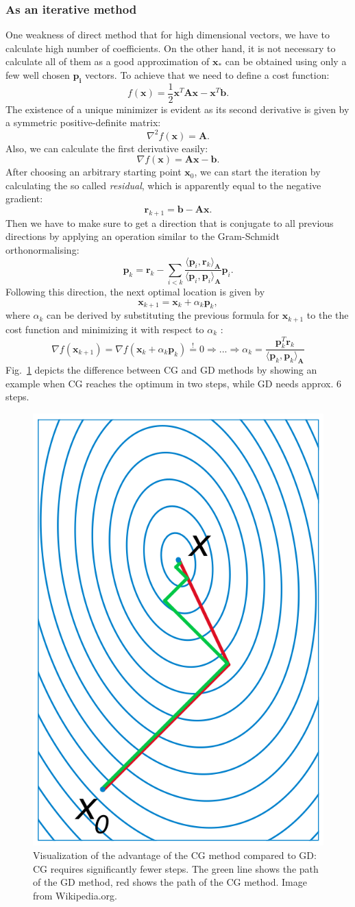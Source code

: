 \subsubsection{As an iterative method} One weakness of direct method that for high dimensional vectors, we have to calculate high number of coefficients. On the other hand, it is not necessary to calculate all of them as a good approximation of $\mathbf{x_* }$ can be obtained using only a few well chosen $\mathbf{p_i}$ vectors. To achieve that we need to define a cost function:
$$f(\mathbf{x}) = \frac{1}{2}\mathbf{x}^T \mathbf{Ax} - \mathbf{x}^T \mathbf{b}.$$
The existence of a unique minimizer is evident as its second derivative is given by a symmetric positive-definite matrix:
$$\nabla^2 f(\mathbf{x}) = \mathbf{A}.$$
Also, we can calculate the first derivative easily:
$$\nabla f(\mathbf{x}) = \mathbf{Ax} - \mathbf{b}.$$
After choosing an arbitrary starting point $\mathbf{x}_0$, we can start the iteration by calculating the so called \textit{residual}, which is apparently equal to the negative gradient:
$$\mathbf{r}_{k+1} = \mathbf{b} - \mathbf{Ax}.$$
Then we have to make sure to get a direction that is conjugate to all previous directions by applying an operation similar to the Gram-Schmidt orthonormalising:
$$\mathbf{p}_k = \mathbf{r}_k - \sum_{i<k} \frac{\langle \mathbf{p}_i, \mathbf{r}_k \rangle_\mathbf{A}}{\langle \mathbf{p}_i, \mathbf{p}_i \rangle_\mathbf{A}} \mathbf{p}_i.$$
Following this direction, the next optimal location is given by
$$\mathbf{x}_{k+1} = \mathbf{x}_k + \alpha_k \mathbf{p}_k,$$
where $\alpha_k$ can be derived by substituting the previous formula for $\mathbf{x}_{k+1}$ to the the cost function and minimizing it with respect to $\alpha_k$ :
$$\nabla f(\mathbf{x}_{k+1}) = \nabla f(\mathbf{x}_k + \alpha_k \mathbf{p}_k)  \overset{!}{=} 0 \Rightarrow ... \Rightarrow \alpha_k = \frac{\mathbf{p}_k^T \mathbf{r}_k}{\langle \mathbf{p}_k, \mathbf{p}_k \rangle_\mathbf{A}}$$
Fig.~\ref{fig:CG_vs_GD} depicts the difference between CG and GD methods by showing an example when CG reaches the optimum in two steps, while GD needs approx. 6 steps.

\begin{figure}
    \centering
    \includegraphics[width=0.3\linewidth]{images/project with Wiem/Conjugate_gradient_illustration.png}
    \caption{Visualization of the advantage of the CG method compared to GD: CG requires significantly fewer steps. The green line shows the path of the GD method, red shows the path of the CG method. Image from Wikipedia.org.}
    \label{fig:CG_vs_GD}
\end{figure}

